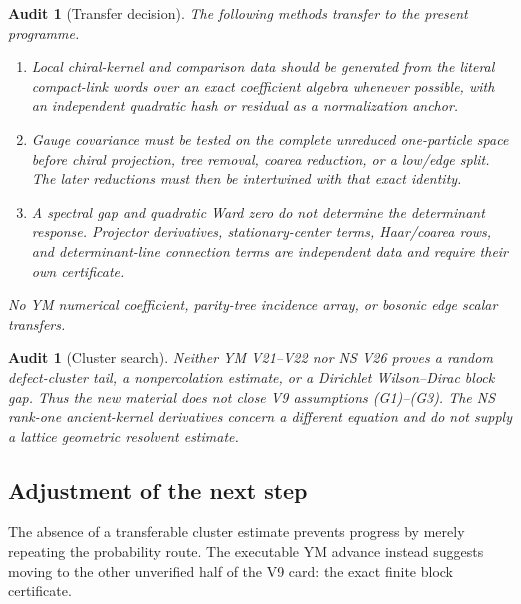 \documentclass[11pt]{article}
\newtheorem{audit}[theorem]{Audit}
\begin{document}
\begin{audit}[Transfer decision]
\label{audit:v11v10-transfer}
The following methods transfer to the present programme.
\begin{enumerate}[label=\textnormal{(\roman*)}]
\item Local chiral-kernel and comparison data should be generated from the
literal compact-link words over an exact coefficient algebra whenever
possible, with an independent quadratic hash or residual as a
normalization anchor.
\item Gauge covariance must be tested on the complete unreduced
one-particle space before chiral projection, tree removal, coarea
reduction, or a low/edge split.  The later reductions must then be
intertwined with that exact identity.
\item A spectral gap and quadratic Ward zero do not determine the
determinant response.  Projector derivatives, stationary-center terms,
Haar/coarea rows, and determinant-line connection terms are independent
data and require their own certificate.
\end{enumerate}
No YM numerical coefficient, parity-tree incidence array, or bosonic
edge scalar transfers.
\end{audit}

\begin{audit}[Cluster search]
\label{audit:v11v10-cluster}
Neither YM V21--V22 nor NS V26 proves a random defect-cluster tail, a
nonpercolation estimate, or a Dirichlet Wilson--Dirac block gap.  Thus the
new material does not close V9 assumptions (G1)--(G3).  The NS rank-one
ancient-kernel derivatives concern a different equation and do not supply
a lattice geometric resolvent estimate.
\end{audit}

\subsection{Adjustment of the next step}

The absence of a transferable cluster estimate prevents progress by
merely repeating the probability route.  The executable YM advance instead
suggests moving to the other unverified half of the V9 card: the exact
finite block certificate.
\end{document}
